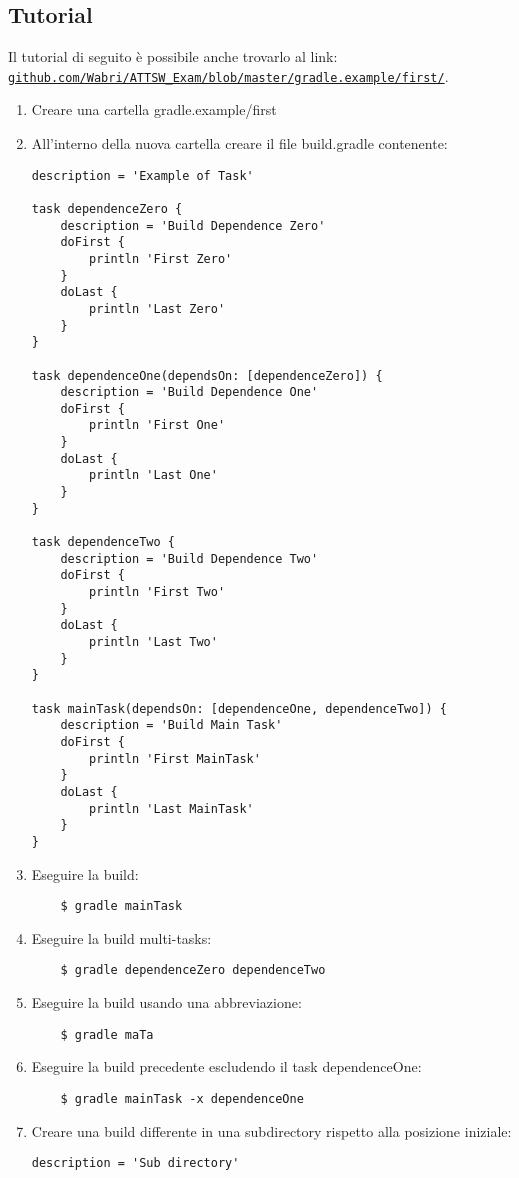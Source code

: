 \subsection{Tutorial}
Il tutorial di seguito è possibile anche trovarlo al link: \href{https://github.com/Wabri/ATTSW_Exam/blob/master/gradle.example/first/}{\texttt{github.com/Wabri/ATTSW\_Exam/blob/master/gradle.example/first/}}.
\begin{enumerate}
    \item Creare una cartella gradle.example/first
    \item All'interno della nuova cartella creare il file build.gradle contenente:
\begin{lstlisting}[frame=single]
description = 'Example of Task'

task dependenceZero {
	description = 'Build Dependence Zero'
	doFirst {
		println 'First Zero'
	}
	doLast {
		println 'Last Zero'
	}
}

task dependenceOne(dependsOn: [dependenceZero]) {
	description = 'Build Dependence One'
	doFirst {
		println 'First One'
	}
	doLast {
		println 'Last One'
	}
}

task dependenceTwo {
	description = 'Build Dependence Two'
	doFirst {
		println 'First Two'
	}
	doLast {
		println 'Last Two'
	}
}

task mainTask(dependsOn: [dependenceOne, dependenceTwo]) {
	description = 'Build Main Task'
	doFirst {
		println 'First MainTask'
	}
	doLast {
		println 'Last MainTask'
	}
}
\end{lstlisting}
    \item Eseguire la build:
    \begin{verbatim}
    $ gradle mainTask
\end{verbatim}
    \item  Eseguire la build multi-tasks:
\begin{verbatim}
    $ gradle dependenceZero dependenceTwo
\end{verbatim}
    \item Eseguire la build usando una abbreviazione:
\begin{verbatim}
    $ gradle maTa
\end{verbatim}
    \item Eseguire la build precedente escludendo il task dependenceOne:
\begin{verbatim}
    $ gradle mainTask -x dependenceOne
\end{verbatim}
    \item Creare una build differente in una subdirectory rispetto alla posizione iniziale: 
\begin{lstlisting}[frame=single]
description = 'Sub directory'


\end{lstlisting}
\end{enumerate}
